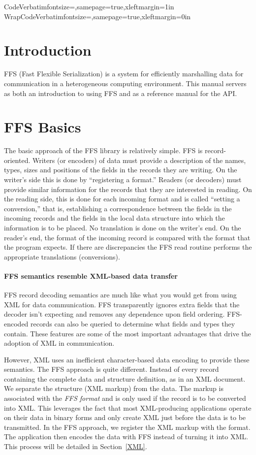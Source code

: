 \DefineVerbatimEnvironment%
{Code}{Verbatim}{fontsize=\small,samepage=true,xleftmargin=1in}
\DefineVerbatimEnvironment%
{WrapCode}{Verbatim}{fontsize=\small,samepage=true,xleftmargin=0in}
\section{Introduction}

FFS (Fast Flexible Serialization) is a system for efficiently marshalling
data for communication in a heterogeneous computing environment.  This
manual servers as both an introduction to using FFS and as a reference
manual for the API.

\section{FFS Basics}

The basic approach of the FFS library is relatively simple.
FFS is record-oriented.  Writers (or encoders) of data must provide a
description of the names, types, sizes and positions of the fields in the
records they are writing.  On the writer's side this is done by ``registering
a format.''  Readers (or decoders) must provide similar information for the
records that they are interested in reading.  On the reading side, this is
done for each incoming format and is called ``setting a conversion,'' that
is, establishing a correspondence between the fields in the incoming records
and the fields in the local data structure into which the information is to
be placed.  No translation is done on the writer's end.  On the reader's
end, the format of the incoming record is compared with the format that the
program expects.  If there are discrepancies the FFS read routine performs
the appropriate translations (conversions).
\paragraph{FFS semantics resemble XML-based data transfer} FFS record
decoding semantics are much like what you would get from using XML for data
communication.  FFS transparently ignores extra fields that the decoder
isn't expecting and removes any dependence upon field ordering.  FFS-encoded
records can also be queried to determine what fields and types they contain.
These features are some of the most important advantages that drive the
adoption of XML in communication.

However, XML uses an inefficient character-based data encoding to provide
these semantics.  The FFS approach is quite different.  Instead of every
record containing the complete data and structure definition, as in an XML
document.  We separate the structure (XML markup) from the data.  The markup
is associated with the {\em FFS format} and is only used if the record is to
be converted into XML.  This leverages the fact that most XML-producing
applications operate on their data in binary forms and only create XML just
before the data is to be transmitted.  In the FFS approach, we register the
XML markup with the format.  The application then encodes the data with FFS
instead of turning it into XML.  This process will be detailed in
Section~\ref{XML}.

